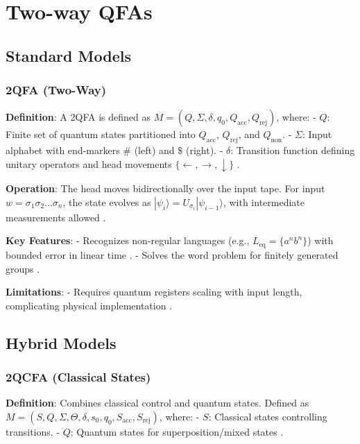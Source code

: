 \section{Two-way QFAs}
\label{sec:two-way-qfas}

\subsection{Standard Models}
\label{subsec:two-way-standard}

\subsubsection{2QFA (Two-Way)}
\label{sssec:2qfa}

\textbf{Definition}: A 2QFA is defined as \( M = (Q, \Sigma, \delta, q_0, Q_{\text{acc}}, Q_{\text{rej}}) \), where:
- \( Q \): Finite set of quantum states partitioned into \( Q_{\text{acc}} \), \( Q_{\text{rej}} \), and \( Q_{\text{non}} \).
- \( \Sigma \): Input alphabet with end-markers \( \# \) (left) and \( \$ \) (right).
- \( \delta \): Transition function defining unitary operators and head movements \( \{ \leftarrow, \rightarrow, \downarrow \} \) \cite{kondacs1997power}.

\textbf{Operation}: The head moves bidirectionally over the input tape. For input \( w = \sigma_1\sigma_2\ldots\sigma_n \), the state evolves as \( |\psi_i\rangle = U_{\sigma_i} |\psi_{i-1}\rangle \), with intermediate measurements allowed \cite{kondacs1997power}.

\textbf{Key Features}:
- Recognizes non-regular languages (e.g., \( L_{\text{eq}} = \{a^n b^n\} \)) with bounded error in linear time \cite{kondacs1997power}.
- Solves the word problem for finitely generated groups \cite{ambainis2002quantum}.

\textbf{Limitations}: 
- Requires quantum registers scaling with input length, complicating physical implementation \cite{ambainis2002quantum}.

\subsection{Hybrid Models}
\label{subsec:two-way-hybrid}

\subsubsection{2QCFA (Classical States)}
\label{sssec:2qcfa}

\textbf{Definition}: Combines classical control and quantum states. Defined as \( M = (S, Q, \Sigma, \Theta, \delta, s_0, q_0, S_{\text{acc}}, S_{\text{rej}}) \), where:
- \( S \): Classical states controlling transitions.
- \( Q \): Quantum states for superposition/mixed states \cite{ambainis2002quantum}.


